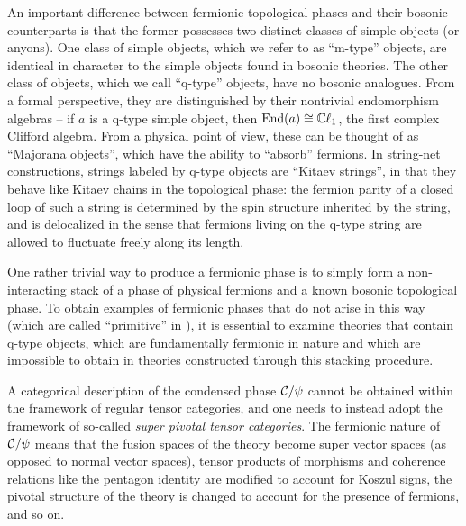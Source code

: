 An important difference between fermionic topological phases and their bosonic counterparts is that 
the former possesses two distinct classes of simple objects (or anyons). 
One class of simple objects, which we refer to as ``m-type'' objects, are identical in character
to the simple objects found in bosonic theories. 
The other class of objects, which we call ``q-type'' objects, have no bosonic analogues. 
From a formal perspective, they are distinguished by their nontrivial endomorphism algebras -- if 
$a$ is a q-type simple object, then $\text{End}(a) \cong \mathbb{C}\ell_1$, the first complex Clifford algebra. 
From a physical point of view, these can be thought of as ``Majorana objects'', which have the ability 
to ``absorb'' fermions. 
In string-net constructions, strings labeled by q-type objects are ``Kitaev strings'', in that they behave like Kitaev chains in the 
topological phase: the fermion parity of a closed loop of such a string is determined by 
the spin structure inherited by the string, and is delocalized in the sense that fermions living on the q-type string are allowed to fluctuate freely along its length.

One rather trivial way to produce a fermionic phase is to simply form a non-interacting stack of a phase of physical fermions 
and a known bosonic topological phase. 
To obtain examples of fermionic phases that do not arise in this way (which are called ``primitive'' in \cite{Lan2016b}),
it is essential to examine theories that contain q-type objects, which are fundamentally fermionic in nature and which are impossible to obtain in theories constructed through this stacking procedure. 

A categorical description of the condensed phase $\mathcal{C} / \psi$ cannot be obtained within the framework 
of regular tensor categories, and one needs to instead adopt the framework of so-called {\it super pivotal tensor categories}. 
The fermionic nature of $\mathcal{C} / \psi$ means that the fusion spaces of the theory become super vector spaces 
(as opposed to normal vector spaces), 
tensor products of morphisms and coherence relations like the pentagon identity are modified to account for Koszul signs, 
the pivotal structure of the theory is changed to account for the presence of fermions, and so on.


